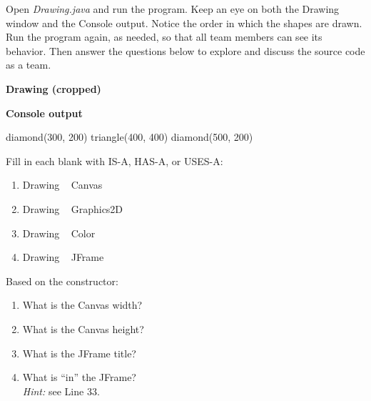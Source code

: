 
Open \textit{Drawing.java} and run the program.
Keep an eye on both the Drawing window and the Console output.
Notice the order in which the shapes are drawn.
Run the program again, as needed, so that all team members can see its behavior.
Then answer the questions below to explore and discuss the source code as a team.

\begin{multicols}{2}

\begin{center}
\textbf{Drawing (cropped)}
\end{center}


\columnbreak

\begin{center}
\textbf{Console output}
\end{center}

\vspace{-1em}

\begin{javalst}
  diamond(300, 200)
      triangle(400, 400)
  diamond(500, 200)
\end{javalst}

\end{multicols}




\Q Fill in each blank with IS-A, HAS-A, or USES-A:

\setlength{\defaultwidth}{5em}

\begin{multicols}{2}
\begin{enumerate}
\item Drawing ~   Canvas
\item Drawing ~  Graphics2D
\item Drawing ~ Color
\item Drawing ~ JFrame
\end{enumerate}
\end{multicols}


\Q Based on the  constructor:

\begin{multicols}{2}
\begin{enumerate}
\item What is the Canvas width? 
\item What is the Canvas height? 
   \\
\item What is the JFrame title? 
\item What is ``in'' the JFrame? 
   \\ \textit{Hint:} see Line 33.
\end{enumerate}
\end{multicols}


